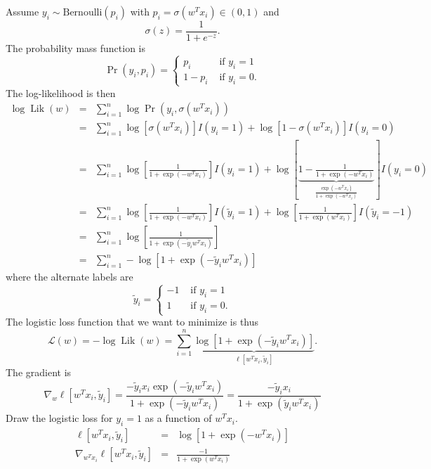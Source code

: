 \documentclass{article}
\DeclareMathOperator*{\Lik}{Lik}
\begin{document}
Assume $y_i\sim \text{Bernoulli}(p_i)$ with
$p_i = \sigma(w^T x_i)\in(0,1)$ and
\begin{equation*}
  \sigma(z) = \frac{1}{1+e^{-z}}.
\end{equation*}
The probability mass function is
\begin{equation*}
  \Pr(y_i, p_i) =
  \begin{cases}
    p_i & \text{ if } y_i=1\\
    1-p_i & \text{ if } y_i=0.
  \end{cases}
\end{equation*}
The log-likelihood is then
\begin{eqnarray*}
  \log\Lik(w) &=& \sum_{i=1}^n\log \Pr(y_i, \sigma(w^T x_i))\\
&=& \sum_{i=1}^n \log[\sigma(w^T x_i)] I(y_i=1) + \log[1-\sigma(w^T x_i)] I(y_i=0)\\
&=& \sum_{i=1}^n \log[\frac{1}{1+\exp(-w^T x_i)}] I(y_i=1) + 
\log[\underbrace{1-\frac{1}{1+\exp(-w^T x_i)}}_{
\frac{\exp(-w^T x_i)}{1+\exp(-w^T x_i)}
}] I(y_i=0)\\
&=& \sum_{i=1}^n \log[\frac{1}{1+\exp(-w^T x_i)}] I(\tilde y_i=1) + 
\log[\frac{1}{1+\exp(w^T x_i)}] I(\tilde y_i=-1)\\
&=& \sum_{i=1}^n \log[\frac{1}{1+\exp(-\tilde y_i w^T x_i)}]\\
&=& \sum_{i=1}^n -\log[1+\exp(-\tilde y_i w^T x_i)]
\end{eqnarray*}
where the alternate labels are 
\begin{equation*}
  \tilde y_i =
  \begin{cases}
    -1 & \text{ if } y_i=1\\
    1 & \text{ if } y_i=0.
  \end{cases}
\end{equation*}
The logistic loss function that we want to minimize is thus
\begin{equation*}
  \mathcal L(w) = -\log\Lik(w) = \sum_{i=1}^n 
\underbrace{\log[1+\exp(-\tilde y_i w^T x_i)]}_{
\ell[w^T x_i, \tilde y_i]
}.
\end{equation*}
The gradient is
\begin{equation*}
\nabla_w \ell[w^T x_i, \tilde y_i] = \frac{
  -\tilde y_i x_i\exp(-\tilde y_i w^T x_i)
}{
  1+\exp(-\tilde y_i w^T x_i)
}=\frac{
  -\tilde y_i x_i
}{
  1+\exp(\tilde y_i w^T x_i)
}
\end{equation*}
Draw the logistic loss for $y_i=1$ as a function of $w^T x_i$. 
\begin{eqnarray*}
\ell[w^T x_i, \tilde y_i] &=& \log[1+\exp(- w^T x_i)] \\
\nabla_{w^T x_i} \ell[w^T x_i, \tilde y_i] &=& \frac{
  - 1
}{
  1+\exp( w^T x_i)
}
\end{eqnarray*}
\end{document}
